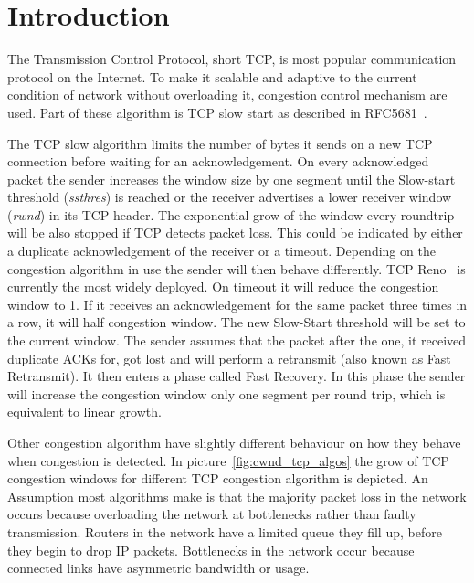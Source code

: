 \section{Introduction}
\label{sec:introduction}

The Transmission Control Protocol, short TCP, is most popular communication
protocol on the Internet. To make it scalable and adaptive to the current
condition of network without overloading it, congestion control mechanism are
used. Part of these algorithm is TCP slow start as described in
RFC5681~\cite{rfc5681}.

The TCP slow algorithm limits the number of bytes it sends on a new TCP
connection before waiting for an acknowledgement. On every acknowledged packet
the sender increases the window size by one segment until the Slow-start
threshold (\emph{ssthres}) is reached  or the receiver advertises a lower
receiver window (\emph{rwnd}) in its TCP header. The exponential grow of the
window every roundtrip will be also stopped if TCP detects packet loss. This
could be indicated by either a duplicate acknowledgement of the receiver or a
timeout. Depending on the congestion algorithm in use the sender will then
behave differently. TCP Reno~\cite{rfc2581} is currently the most widely
deployed. On timeout it will reduce the congestion window to 1. If it receives
an acknowledgement for the same packet three times in a row, it will half
congestion window. The new Slow-Start threshold will be set to the current
window. The sender assumes that the packet after the one, it received duplicate
ACKs for, got lost and will perform a retransmit (also known as Fast
Retransmit). It then enters a phase called Fast Recovery. In this phase the
sender will increase the congestion window only one segment per round trip,
which is equivalent to linear growth.

Other congestion algorithm have slightly different behaviour on how they behave
when congestion is detected. In picture~\ref{fig:cwnd_tcp_algos} the grow of TCP
congestion windows for different TCP congestion algorithm is depicted. An
Assumption most algorithms make is that the majority packet loss in the network
occurs because overloading the network at bottlenecks rather than faulty
transmission. Routers in the network have a limited queue they fill up, before
they begin to drop IP packets. Bottlenecks in the network occur because
connected links have asymmetric bandwidth or usage.

